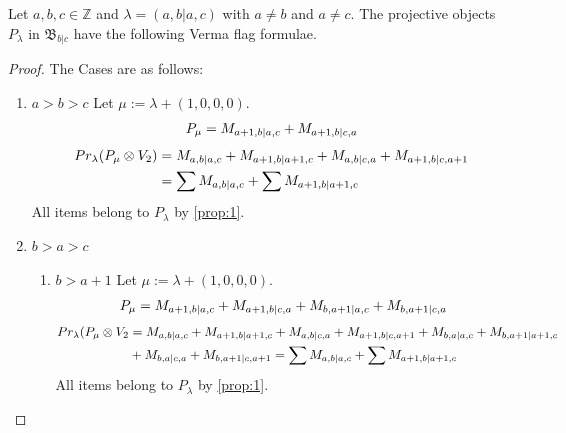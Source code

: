 \begin{theorem}
  Let $a,b,c \in \mathbb{Z}$ and $\lambda = (a,b|a,c)$ with $a \neq b$ and $a \neq c$. The projective objects $P_{\lambda}$ in $\mathfrak{B}_{b|c}$ have the following Verma flag formulae.
\end{theorem}
\begin{proof} The Cases are as follows:\par
\begin{enumerate}

\item $a>b>c$
        Let $\mu:=\lambda + (1,0,0,0) $. 
\begin{equation}\notag
  \begin{aligned}
      P_{\mu} =
M_{a+1,b|a,c}
+M_{a+1,b|c,a}
  \end{aligned}
\end{equation}
\begin{equation}\notag
  \begin{aligned}
  Pr_{\lambda}(P_\mu \otimes V_2) &=
M_{a,b|a,c}
+M_{a+1,b|a+1,c}
+M_{a,b|c,a}
+M_{a+1,b|c,a+1} \\
                                  &=
\sum M_{a,b|a,c}
+\sum M_{a+1,b|a+1,c}
  \end{aligned}
\end{equation}
All items belong to $P_\lambda$ by \cref{prop:1}.

\item $b>a>c$
  \begin{enumerate}
    \item $b>a+1$
        Let $\mu:=\lambda + (1,0,0,0) $. 
\begin{equation}\notag
  \begin{aligned}
      P_{\mu} =
M_{a+1,b|a,c}
+M_{a+1,b|c,a}
+M_{b,a+1|a,c}
+M_{b,a+1|c,a}
  \end{aligned}
\end{equation}
\begin{equation}\notag
  \begin{aligned}
  Pr_{\lambda}(P_\mu \otimes V_2 &=
M_{a,b|a,c}
+M_{a+1,b|a+1,c}
+M_{a,b|c,a}
+M_{a+1,b|c,a+1}
+M_{b,a|a,c}
+M_{b,a+1|a+1,c} \\
                                 &+
M_{b,a|c,a}
+M_{b,a+1|c,a+1}
                                 =
\sum M_{a,b|a,c}
+\sum M_{a+1,b|a+1,c}
  \end{aligned}
\end{equation}
All items belong to $P_\lambda$ by \cref{prop:1}.
    

\end{enumerate}
\end{enumerate}
\end{proof}
